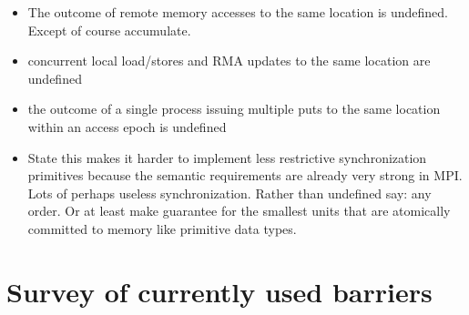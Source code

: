 \documentclass[a4paper, 10pt]{article}
\begin{document}
\begin{itemize}
\begin{itemize}
\begin{itemize}
					\item The outcome of remote memory accesses to the same location is undefined. Except of course accumulate.
					\item concurrent local load/stores and RMA updates to the same location are undefined
					\item the outcome of a single process issuing multiple puts to the same location within an access epoch is undefined
					\item State this makes it harder to implement less restrictive synchronization primitives because the semantic requirements are already very strong in MPI. Lots of perhaps useless synchronization. Rather than undefined say: any order. Or at least make guarantee for the smallest units that are atomically committed to memory like primitive data types.
				\end{itemize}
		\end{itemize}
\end{itemize}

\section{Survey of currently used barriers}

\end{document}
